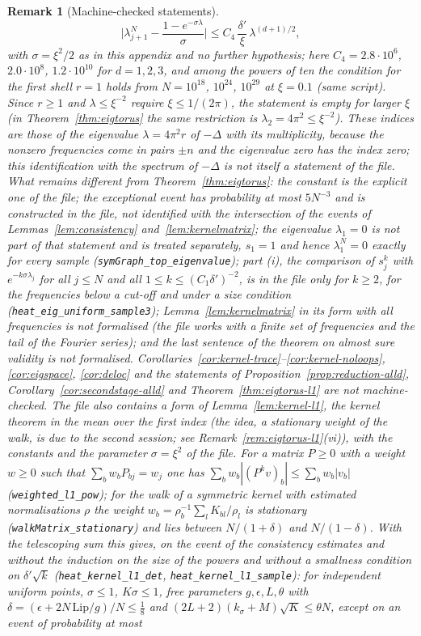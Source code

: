 \documentclass[11pt,a4paper]{article}
\theoremstyle{stmt}
\theoremstyle{defn}
\theoremstyle{rmk}
\newtheorem{remark}[theorem]{Remark}
\numberwithin{equation}{section}
\begin{document}
{\begin{remark}[Machine-checked statements]
\[
\Big|\lambda^N_{j+1}-\frac{1-e^{-\sigma\lambda}}{\sigma}\Big|\le C_4\,\frac{\delta'}\xi\,\lambda^{(d+1)/2},
\]
with $\sigma=\xi^2/2$ as in this appendix and no further hypothesis; here $C_4=2.8\cdot10^{6}$, $2.0\cdot10^{8}$, $1.2\cdot10^{10}$ for $d=1,2,3$, and among the powers of ten the condition for the first shell $r=1$ holds from $N=10^{18}$, $10^{24}$, $10^{29}$ at $\xi=0.1$ (same script). Since $r\ge1$ and $\lambda\le\xi^{-2}$ require $\xi\le1/(2\pi)$, the statement is empty for larger $\xi$ (in Theorem~\ref{thm:eigtorus} the same restriction is $\lambda_2=4\pi^2\le\xi^{-2}$). These indices are those of the eigenvalue $\lambda=4\pi^2r$ of $-\Delta$ with its multiplicity, because the nonzero frequencies come in pairs $\pm n$ and the eigenvalue zero has the index zero; this identification with the spectrum of $-\Delta$ is not itself a statement of the file. What remains different from Theorem~\ref{thm:eigtorus}: the constant is the explicit one of the file; the exceptional event has probability at most $5N^{-3}$ and is constructed in the file, not identified with the intersection of the events of Lemmas~\ref{lem:consistency} and~\ref{lem:kernelmatrix}; the eigenvalue $\lambda_1=0$ is not part of that statement and is treated separately, $s_1=1$ and hence $\lambda^N_1=0$ exactly for every sample (\texttt{symGraph\_top\_eigenvalue}); part (i), the comparison of $s_j^k$ with $e^{-k\sigma\lambda_j}$ for all $j\le N$ and all $1\le k\le(C_1\delta')^{-2}$, is in the file only for $k\ge2$, for the frequencies below a cut-off and under a size condition (\texttt{heat\_eig\_uniform\_sample3}); Lemma~\ref{lem:kernelmatrix} in its form with all frequencies is not formalised (the file works with a finite set of frequencies and the tail of the Fourier series); and the last sentence of the theorem on almost sure validity is not formalised. Corollaries~\ref{cor:kernel-trace}--\ref{cor:kernel-noloops}, \ref{cor:eigspace}, \ref{cor:deloc} and the statements of Proposition~\ref{prop:reduction-alld}, Corollary~\ref{cor:secondstage-alld} and Theorem~\ref{thm:eigtorus-l1} are not machine-checked. The file also contains a form of Lemma~\ref{lem:kernel-l1}, the kernel theorem in the mean over the first index (the idea, a stationary weight of the walk, is due to the second session; see Remark~\ref{rem:eigtorus-l1}(vi)), with the constants and the parameter $\sigma=\xi^2$ of the file. For a matrix $P\ge0$ with a weight $w\ge0$ such that $\sum_bw_bP_{bj}=w_j$ one has $\sum_bw_b|(P^kv)_b|\le\sum_bw_b|v_b|$ (\texttt{weighted\_l1\_pow}); for the walk of a symmetric kernel with estimated normalisations $\rho$ the weight $w_b=\rho_b^{-1}\sum_lK_{bl}/\rho_l$ is stationary (\texttt{walkMatrix\_stationary}) and lies between $N/(1+\delta)$ and $N/(1-\delta)$. With the telescoping sum this gives, on the event of the consistency estimates and without the induction on the size of the powers and without a smallness condition on $\delta'\sqrt k$ (\texttt{heat\_kernel\_l1\_det}, \texttt{heat\_kernel\_l1\_sample}): for independent uniform points, $\sigma\le1$, $K\sigma\le1$, free parameters $g,\epsilon,L,\theta$ with $\delta=(\epsilon+2N\,\mathrm{Lip}/g)/N\le\frac18$ and $(2L+2)(k_\sigma+M)\sqrt K\le\theta N$, except on an event of probability at most 
\end{remark}}
\end{document}
